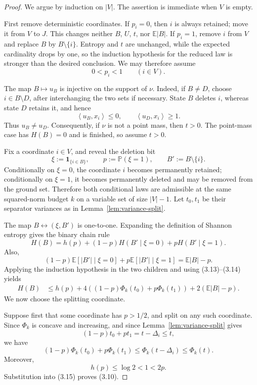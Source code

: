 \documentclass[10pt,a4paper]{amsart}
\newcommand{\E}{\mathbb E}
\newcommand{\Pp}{\mathbb P}
\newcommand{\ip}[2]{\left\langle #1,#2\right\rangle}
\newcommand{\one}{\mathbf 1}
\begin{document}
\begin{proof}
We argue by induction on \(|V|\). The assertion is immediate when \(V\) is
empty.

First remove deterministic coordinates. If \(p_i=0\), then \(i\) is always
retained; move it from \(V\) to \(J\). This changes neither \(B\), \(U\),
\(t\), nor \(\E|B|\). If \(p_i=1\), remove \(i\) from \(V\) and replace
\(B\) by \(B\setminus\{i\}\). Entropy and \(t\) are unchanged, while the
expected cardinality drops by one, so the induction hypothesis for the
reduced law is stronger than the desired conclusion. We may therefore
assume
\[
 0<p_i<1\qquad(i\in V).
 \tag{3.12}
\]

The map \(B\mapsto u_B\) is injective on the support of \(\nu\). Indeed, if
\(B\ne D\), choose \(i\in B\setminus D\), after interchanging the two sets
if necessary. State \(B\) deletes \(i\), whereas state \(D\) retains it, and
hence
\[
 \ip{u_B}{x_i}\le0,
 \qquad
 \ip{u_D}{x_i}\ge1.
\]
Thus \(u_B\ne u_D\). Consequently, if \(\nu\) is not a point mass, then
\(t>0\). The point-mass case has \(H(B)=0\) and is finished, so assume
\(t>0\).

Fix a coordinate \(i\in V\), and reveal the deletion bit
\[
 \xi:=\one_{\{i\in B\}},
 \qquad
 p:=\Pp(\xi=1),
 \qquad
 B':=B\setminus\{i\}.
\]
Conditionally on \(\xi=0\), the coordinate \(i\) becomes permanently retained;
conditionally on \(\xi=1\), it becomes permanently deleted and may be removed
from the ground set. Therefore both conditional laws are admissible at the
same squared-norm budget \(k\) on a variable set of size \(|V|-1\). Let \(t_0,t_1\) be
their separator variances as in Lemma~\ref{lem:variance-split}.

The map \(B\leftrightarrow(\xi,B')\) is one-to-one. Expanding the definition of
Shannon entropy gives the binary chain rule
\[
 H(B)
 =
 h(p)
 +(1-p)H(B'\mid \xi=0)
 +pH(B'\mid \xi=1).
 \tag{3.13}
\]
Also,
\[
 (1-p)\E[|B'|\mid \xi=0]
 +p\E[|B'|\mid \xi=1]
 =
 \E|B|-p.
 \tag{3.14}
\]
Applying the induction hypothesis in the two children and using
(3.13)--(3.14) yields
\[
 \begin{aligned}
 H(B)
 &\le
 h(p)
 +4\left(
      (1-p)\Phi_k(t_0)
      +p\Phi_k(t_1)
   \right)
 +2(\E|B|-p).
 \end{aligned}
 \tag{3.15}
\]
We now choose the splitting coordinate.

Suppose first that some coordinate has \(p>1/2\), and split on any such
coordinate. Since \(\Phi_k\) is concave and increasing, and since
Lemma~\ref{lem:variance-split} gives
\[
 (1-p)t_0+pt_1=t-\Delta_i\le t,
\]
we have
\[
 (1-p)\Phi_k(t_0)+p\Phi_k(t_1)
 \le
 \Phi_k(t-\Delta_i)
 \le
 \Phi_k(t).
 \tag{3.16}
\]
Moreover,
\[
 h(p)\le\log2<1<2p.
 \tag{3.17}
\]
Substitution into (3.15) proves (3.10).


\end{proof}
\end{document}
